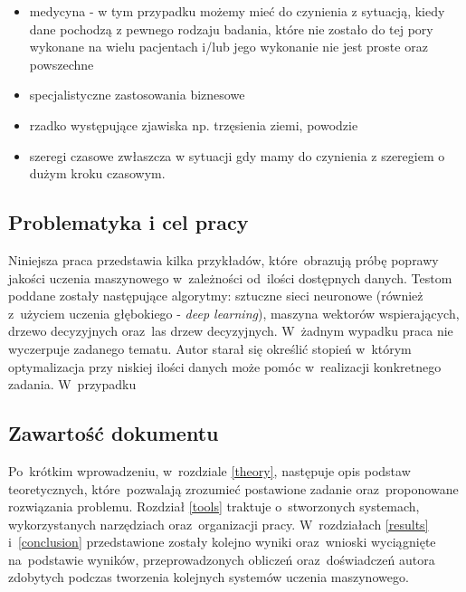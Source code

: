 \begin{itemize}
\item medycyna - w tym przypadku możemy mieć do czynienia z sytuacją, kiedy dane pochodzą z pewnego rodzaju badania, które nie zostało do tej pory wykonane na wielu pacjentach i/lub jego wykonanie nie jest proste oraz powszechne
\item specjalistyczne zastosowania biznesowe
\item rzadko występujące zjawiska np. trzęsienia ziemi, powodzie
\item szeregi czasowe  zwłaszcza w sytuacji gdy mamy do czynienia z szeregiem o dużym kroku czasowym.
\end{itemize}

\subsection{Problematyka i cel pracy}
Niniejsza praca przedstawia kilka przykładów, które~obrazują próbę poprawy jakości uczenia maszynowego w~zależności od~ilości dostępnych danych. Testom poddane  zostały następujące algorytmy: sztuczne sieci neuronowe (również z~użyciem uczenia głębokiego - \textit{deep learning}), maszyna wektorów wspierających, drzewo decyzyjnych oraz~las drzew decyzyjnych. W~żadnym wypadku praca nie wyczerpuje zadanego tematu. Autor starał się określić stopień w~którym optymalizacja przy niskiej ilości danych może pomóc w~realizacji konkretnego zadania. W~przypadku 

\subsection{Zawartość dokumentu}
Po~krótkim wprowadzeniu, w~rozdziale \ref{theory}, następuje opis podstaw teoretycznych, które~pozwalają zrozumieć postawione zadanie oraz~proponowane rozwiązania problemu. Rozdział \ref{tools} traktuje o~stworzonych systemach, wykorzystanych narzędziach oraz~organizacji pracy. W~rozdziałach \ref{results} i~\ref{conclusion} przedstawione zostały kolejno wyniki oraz~wnioski wyciągnięte na~podstawie wyników, przeprowadzonych obliczeń oraz~doświadczeń autora zdobytych podczas tworzenia kolejnych systemów uczenia maszynowego.



